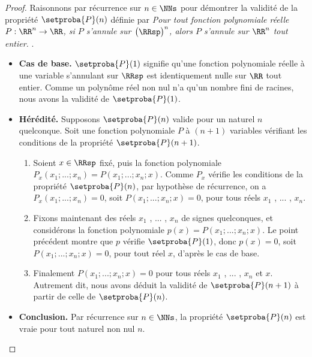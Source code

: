 \begin{proof}
	Raisonnons par récurrence sur $n \in \NNs$ pour démontrer la validité de la propriété $\setproba{P}(n)$ définie par
	\emph{\og 
		Pour tout fonction polynomiale réelle $P: \RR^n \rightarrow \RR$,
		si $P$ s'annule sur $\big( \RRsp \big)^n$,
		alors $P$ s'annule sur $\RR^n$ tout entier. 
	\fg}\kern2pt.
	\begin{itemize}[label=\small\textbullet]
		\item \textbf{Cas de base.}
		$\setproba{P}(1)$ signifie qu'une fonction polynomiale réelle à une variable s'annulant sur $\RRsp$ est identiquement nulle sur $\RR$ tout entier.
		Comme un polynôme réel non nul n'a qu'un nombre fini de racines, nous avons la validité de $\setproba{P}(1)$.


		\item \textbf{Hérédité.}
		Supposons $\setproba{P}(n)$ valide pour un naturel $n$ quelconque.
		Soit une fonction polynomiale $P$ à $(n + 1)$ variables vérifiant les conditions de la propriété $\setproba{P}(n + 1)$.
		\begin{enumerate}
		    \item Soient $x \in \RRsp$ fixé, puis la fonction polynomiale $P_x(x_1 ; ... ; x_n) = P(x_1 ; ... ; x_n ; x)$.
		    Comme $P_x$ vérifie les conditions de la propriété $\setproba{P}(n)$, par hypothèse de récurrence, on a
		    $P_x(x_1 ; ... ; x_n) = 0$, soit $P(x_1 ; ... ; x_n ; x) = 0$, pour tous réels $x_1$ , ... , $x_n$.


		    \item Fixons maintenant des réels $x_1$ , ... , $x_n$ de signes quelconques, et considérons la fonction polynomiale $p(x) = P(x_1 ; ... ; x_n ; x)$.
		    Le point précédent montre que $p$ vérifie $\setproba{P}(1)$, donc $p(x) = 0$, soit $P(x_1 ; ... ; x_n ; x) = 0$, pour tout réel $x$, d'après le cas de base.


		    \item Finalement $P(x_1 ; ... ; x_n ; x) = 0$ pour tous réels $x_1$ , ... , $x_n$ et $x$.
		    Autrement dit, nous avons déduit la validité de $\setproba{P}(n+1)$ à partir de celle de $\setproba{P}(n)$.
		\end{enumerate}
		
		
		\item \textbf{Conclusion.}
		Par récurrence sur $n \in \NNs$, la propriété $\setproba{P}(n)$ est vraie pour tout naturel non nul $n$.
	\end{itemize}

	\null\vspace{-6ex}
\end{proof}



